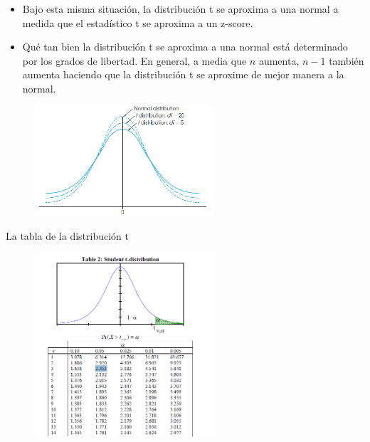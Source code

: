 \documentclass{beamer}
\begin{document}
\begin{frame}
\begin{itemize}
\justifying
\item Bajo esta misma situación, la distribución t se aproxima a una normal a medida que el estadístico t se aproxima a un z-score. 
\item Qué tan bien la distribución t se aproxima a una normal está determinado por los grados de libertad. En general, a media que $n$ aumenta, $n-1$ también aumenta haciendo que la distribución t se aproxime de mejor manera a la normal.
\end{itemize}
					\begin{figure}[H]
						\centering  
						\caption{} 
						\includegraphics[width = 0.6\textwidth]{./cap2}
					\end{figure}
\end{frame}

\begin{frame}{La tabla de la distribución t}
					\begin{figure}[H]
						\centering  
						\caption{} 
						\includegraphics[width = 0.6\textwidth]{./cap1}
					\end{figure}
\end{frame}
\end{document}
